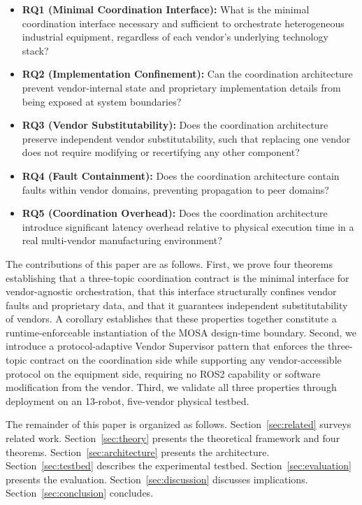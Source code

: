 \documentclass[a4paper,fleqn]{cas-dc}
\begin{document}
\begin{itemize}
    \item \textbf{RQ1 (Minimal Coordination Interface):} What is the minimal coordination interface necessary and sufficient to orchestrate heterogeneous industrial equipment, regardless of each vendor's underlying technology stack?
    \item \textbf{RQ2 (Implementation Confinement):} Can the coordination architecture prevent vendor-internal state and proprietary implementation details from being exposed at system boundaries?
    \item \textbf{RQ3 (Vendor Substitutability):} Does the coordination architecture preserve independent vendor substitutability, such that replacing one vendor does not require modifying or recertifying any other component?
    \item \textbf{RQ4 (Fault Containment):} Does the coordination architecture contain faults within vendor domains, preventing propagation to peer domains?
    \item \textbf{RQ5 (Coordination Overhead):} Does the coordination architecture introduce significant latency overhead relative to physical execution time in a real multi-vendor manufacturing environment?
\end{itemize}

The contributions of this paper are as follows. First, we prove four theorems establishing that a three-topic coordination contract is the minimal interface for vendor-agnostic orchestration, that this interface structurally confines vendor faults and proprietary data, and that it guarantees independent substitutability of vendors. A corollary establishes that these properties together constitute a runtime-enforceable instantiation of the MOSA design-time boundary. Second, we introduce a protocol-adaptive Vendor Supervisor pattern that enforces the three-topic contract on the coordination side while supporting any vendor-accessible protocol on the equipment side, requiring no ROS2 capability or software modification from the vendor. Third, we validate all three properties through deployment on an 13-robot, five-vendor physical testbed.

The remainder of this paper is organized as follows. Section~\ref{sec:related} surveys related work. Section~\ref{sec:theory} presents the theoretical framework and four theorems. Section~\ref{sec:architecture} presents the architecture. Section~\ref{sec:testbed} describes the experimental testbed. Section~\ref{sec:evaluation} presents the evaluation. Section~\ref{sec:discussion} discusses implications. Section~\ref{sec:conclusion} concludes.
\end{document}
